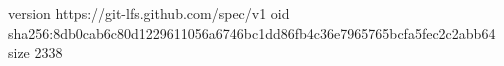 version https://git-lfs.github.com/spec/v1
oid sha256:8db0cab6c80d1229611056a6746bc1dd86fb4c36e7965765bcfa5fec2c2abb64
size 2338

